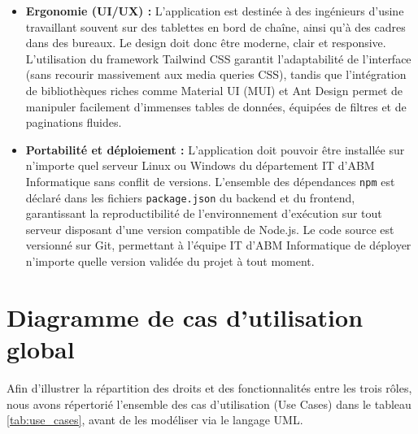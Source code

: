 \begin{itemize}
    \item \textbf{Ergonomie (UI/UX) :} L'application est destinée à des ingénieurs d'usine travaillant souvent sur des tablettes en bord de chaîne, ainsi qu'à des cadres dans des bureaux. Le design doit donc être moderne, clair et responsive. L'utilisation du framework Tailwind CSS garantit l'adaptabilité de l'interface (sans recourir massivement aux media queries CSS), tandis que l'intégration de bibliothèques riches comme Material UI (MUI) et Ant Design permet de manipuler facilement d'immenses tables de données, équipées de filtres et de paginations fluides.
    
    \item \textbf{Portabilité et déploiement :} L'application doit pouvoir être installée sur n'importe quel serveur Linux ou Windows du département IT d'ABM Informatique sans conflit de versions. L'ensemble des dépendances \texttt{npm} est déclaré dans les fichiers \texttt{package.json} du backend et du frontend, garantissant la reproductibilité de l'environnement d'exécution sur tout serveur disposant d'une version compatible de Node.js. Le code source est versionné sur Git, permettant à l'équipe IT d'ABM Informatique de déployer n'importe quelle version validée du projet à tout moment.
\end{itemize}

\section{Diagramme de cas d'utilisation global}
Afin d'illustrer la répartition des droits et des fonctionnalités entre les trois rôles, nous avons répertorié l'ensemble des cas d'utilisation (Use Cases) dans le tableau \ref{tab:use_cases}, avant de les modéliser via le langage UML.

